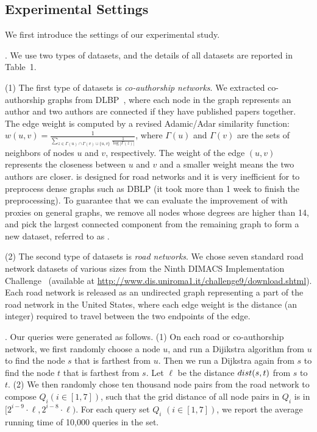 \subsection{Experimental Settings}
We first introduce the settings of our experimental study.







.
We use two types of datasets, and the details of all datasets are reported in Table~1.



\sstab (1) The first type of datasets is {\em co-authorship networks}. We extracted co-authorship graphs from DLBP~\cite{snapnets}, where each node in the graph represents an author and two authors are connected if they have published papers together. The edge weight is computed by a revised Adamic/Adar similarity function: $w(u,v) = \frac{1}{\sum_{z\in {\Gamma(u)\cap \Gamma(v) \cup \{u,v\}}}\frac{1}{\log{|\Gamma(z)|}}}$, where $\Gamma(u)$ and $\Gamma(v)$ are the sets of neighbors of nodes $u$ and $v$, respectively. The weight of the edge $(u,v)$ represents the closeness between $u$ and $v$ and a smaller weight means the two authors are closer. \tnr is designed for road networks and it is very inefficient for \tnr to preprocess dense graphs such as DBLP (it took more than 1 week to finish the preprocessing). To guarantee that we can evaluate the improvement of \tnr with proxies on general graphs, we remove all nodes whose degrees are higher than 14, and pick the largest connected component from the remaining graph to form a new dataset, referred to as \dblpone.


\sstab (2) The second type of datasets is {\em road networks}. We chose seven standard road network datasets of various sizes from the Ninth DIMACS
Implementation Challenge~\cite{dimacs-datasets} (available at {\url{http://www.dis.uniroma1.it/challenge9/download.shtml}}). Each road network is released as an undirected graph representing a part of the road network in the United States, where each edge weight is the distance (an integer) required to travel between the two endpoints of the edge.


. Our queries were generated as follows.
(1) On each road  or co-authorship network, we first randomly choose a node $u$, and run a Dijikstra algorithm from $u$ to find the node $s$ that is farthest from $u$. Then we run a Dijkstra again from $s$ to find the node $t$ that is farthest from $s$. Let $\ell$ be the distance $\dist(s,t)$ from $s$ to $t$.
(2) We then randomly chose ten thousand node pairs from
the road network to compose $Q_i (i \in [1,7])$, such that the grid
distance of all node pairs in $Q_i$ is in $[2^{i-9}\cdot\ell, 2^{i-8}\cdot\ell)$.
For each query set $Q_i$ $(i\in [1,7])$, we report the average running time of 10,000 queries in the set.

